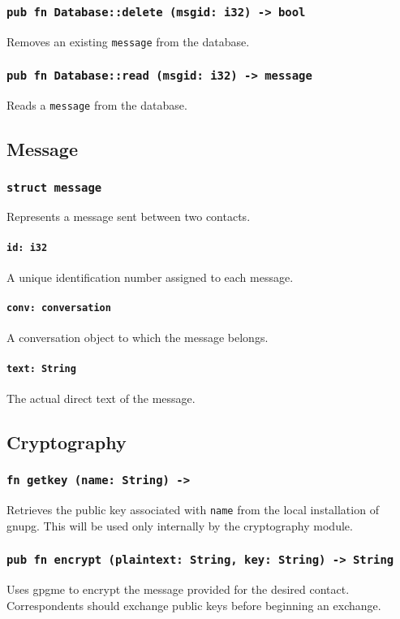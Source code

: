 \documentclass[]{article}
\begin{document}
\subsubsection{\texttt{pub fn Database::delete (msgid: i32) -> bool}}
Removes an existing \verb!message! from the database.
\subsubsection{\texttt{pub fn Database::read (msgid: i32) -> message}}
Reads a \verb!message! from the database.

\subsection{Message}
\subsubsection{\texttt{struct message}}
Represents a message sent between two contacts.
\paragraph{\texttt{id: i32}}
A unique identification number assigned to each message.
\paragraph{\texttt{conv: conversation}}
A conversation object to which the message belongs.
\paragraph{\texttt{text: String}}
The actual direct text of the message.

\subsection{Cryptography}
\subsubsection{\texttt{fn getkey (name: String) -> }}
Retrieves the public key associated with \verb|name| from the local installation of gnupg. This will be used only internally by the cryptography module.
\subsubsection{\texttt{pub fn encrypt (plaintext: String, key: String) -> String}}
Uses gpgme to encrypt the message provided for the desired contact. Correspondents should exchange public keys before beginning an exchange.
\end{document}
